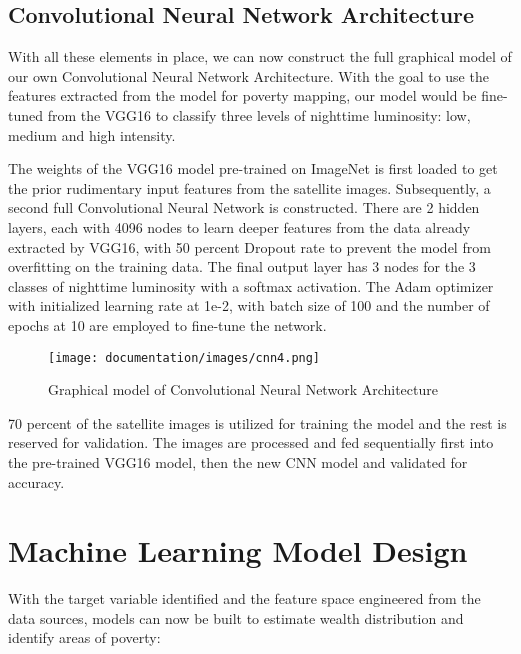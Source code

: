 \documentclass[solid,math,chem,code,plot,gloss]{bmc}
\begin{document}
\subsection{Convolutional Neural Network Architecture} 

With all these elements in place, we can now construct the full graphical model of our own Convolutional Neural Network Architecture. With the goal to use the features extracted from the model for poverty mapping, our model would be fine-tuned from the VGG16 to classify three levels of nighttime luminosity: low, medium and high intensity. 

The weights of the VGG16 model pre-trained on ImageNet is first loaded to get the prior rudimentary input features from the satellite images. Subsequently, a second full Convolutional Neural Network is constructed. There are 2 hidden layers, each with 4096 nodes to learn deeper features from the data already extracted by VGG16, with 50 percent Dropout rate to prevent the model from overfitting on the training data. The final output layer has 3 nodes for the 3 classes of nighttime luminosity with a softmax activation. The Adam optimizer with initialized learning rate at 1e-2, with batch size of 100 and the number of epochs at 10 are employed to fine-tune the network. 

\begin{figure}[hbt!]
    \centering
    \texttt{[image: documentation/images/cnn4.png]}
    \caption{Graphical model of Convolutional Neural Network Architecture}
    \label{fig:cnn}
\end{figure}

70 percent of the satellite images is utilized for training the model and the rest is reserved for validation. The images are processed and fed sequentially first into the pre-trained VGG16 model, then the new CNN model and validated for accuracy. 

\section{Machine Learning Model Design}

With the target variable identified and the feature space engineered from the data sources, models can now be built to estimate wealth distribution and identify areas of poverty:  
\end{document}
